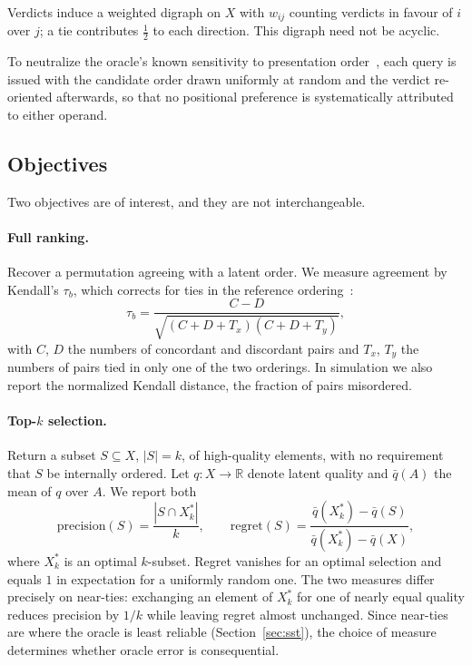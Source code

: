 \documentclass[11pt,a4paper]{article}
\begin{document}
Verdicts induce a weighted digraph on $X$ with $w_{ij}$ counting verdicts in
favour of $i$ over $j$; a tie contributes $\tfrac12$ to each direction. This
digraph need not be acyclic.

To neutralize the oracle's known sensitivity to presentation
order~\cite{zheng2023}, each query is issued with the candidate order drawn
uniformly at random and the verdict re-oriented afterwards, so that no positional
preference is systematically attributed to either operand.

\subsection{Objectives}

Two objectives are of interest, and they are not interchangeable.

\paragraph{Full ranking.} Recover a permutation agreeing with a latent order. We
measure agreement by Kendall's $\tau_b$, which corrects for ties in the reference
ordering~\cite{kendall1945}:
\begin{equation}
\tau_b = \frac{C - D}{\sqrt{(C+D+T_x)(C+D+T_y)}},
\end{equation}
with $C$, $D$ the numbers of concordant and discordant pairs and $T_x$, $T_y$
the numbers of pairs tied in only one of the two orderings. In simulation we
also report the normalized Kendall distance, the fraction of pairs misordered.

\paragraph{Top-$k$ selection.} Return a subset $S \subseteq X$, $|S| = k$, of
high-quality elements, with no requirement that $S$ be internally ordered. Let
$q: X \to \mathbb{R}$ denote latent quality and $\bar q(A)$ the mean of $q$ over
$A$. We report both
\begin{equation}
\text{precision}(S) = \frac{|S \cap X_k^{*}|}{k},
\qquad
\mathrm{regret}(S) = \frac{\bar q(X_k^{*}) - \bar q(S)}
                          {\bar q(X_k^{*}) - \bar q(X)},
\label{eq:regret}
\end{equation}
where $X_k^{*}$ is an optimal $k$-subset. Regret vanishes for an optimal
selection and equals $1$ in expectation for a uniformly random one. The two
measures differ precisely on near-ties: exchanging an element of $X_k^{*}$ for
one of nearly equal quality reduces precision by $1/k$ while leaving regret
almost unchanged. Since near-ties are where the oracle is least reliable
(Section~\ref{sec:sst}), the choice of measure determines whether oracle error
is consequential.
\end{document}
